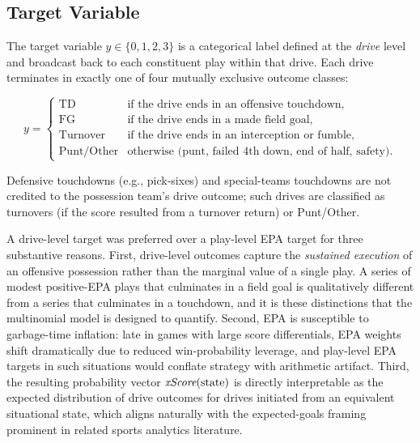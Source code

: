 \subsection{Target Variable}

The target variable $y \in \{0, 1, 2, 3\}$ is a categorical label defined at
the \emph{drive} level and broadcast back to each constituent play within that
drive. Each drive terminates in exactly one of four mutually exclusive outcome
classes:

\begin{equation}
  y =
  \begin{cases}
    \text{TD}         & \text{if the drive ends in an offensive touchdown}, \\
    \text{FG}         & \text{if the drive ends in a made field goal}, \\
    \text{Turnover}   & \text{if the drive ends in an interception or fumble}, \\
    \text{Punt/Other} & \text{otherwise (punt, failed 4th down, end of half, safety).}
  \end{cases}
\end{equation}

Defensive touchdowns (e.g., pick-sixes) and special-teams touchdowns are not
credited to the possession team's drive outcome; such drives are classified as
turnovers (if the score resulted from a turnover return) or Punt/Other.

A drive-level target was preferred over a play-level EPA target for three
substantive reasons. First, drive-level outcomes capture the \emph{sustained
execution} of an offensive possession rather than the marginal value of a
single play. A series of modest positive-EPA plays that culminates in a
field goal is qualitatively different from a series that culminates in a
touchdown, and it is these distinctions that the multinomial \xscore{} model
is designed to quantify. Second, EPA is susceptible to garbage-time inflation:
late in games with large score differentials, EPA weights shift dramatically
due to reduced win-probability leverage, and play-level EPA targets in such
situations would conflate strategy with arithmetic artifact. Third, the
resulting probability vector $\textit{xScore}(\text{state})$ is directly
interpretable as the expected distribution of drive outcomes for drives
initiated from an equivalent situational state, which aligns naturally with
the expected-goals framing prominent in related sports analytics literature.

